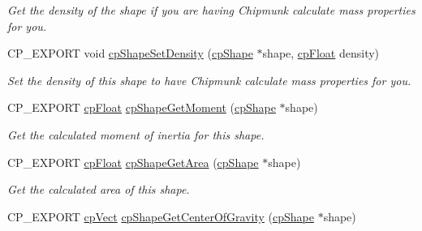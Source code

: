 \begin{DoxyCompactItemize}
\begin{DoxyCompactList}\small\item\em Get the density of the shape if you are having Chipmunk calculate mass properties for you. \end{DoxyCompactList}\item 
\mbox{\label{group__cp_shape_ga6b52b02dd8c60fb33713869ef5bba948}} 
C\+P\+\_\+\+E\+X\+P\+O\+RT void \mbox{\hyperlink{group__cp_shape_ga6b52b02dd8c60fb33713869ef5bba948}{cp\+Shape\+Set\+Density}} (\mbox{\hyperlink{structcp_shape}{cp\+Shape}} $\ast$shape, \mbox{\hyperlink{group__basic_types_gac1ed65573e035bf892505768c852d8d3}{cp\+Float}} density)
\begin{DoxyCompactList}\small\item\em Set the density of this shape to have Chipmunk calculate mass properties for you. \end{DoxyCompactList}\item 
\mbox{\label{group__cp_shape_ga5b6d2a25a83812d8d97b40ad7d956c8e}} 
C\+P\+\_\+\+E\+X\+P\+O\+RT \mbox{\hyperlink{group__basic_types_gac1ed65573e035bf892505768c852d8d3}{cp\+Float}} \mbox{\hyperlink{group__cp_shape_ga5b6d2a25a83812d8d97b40ad7d956c8e}{cp\+Shape\+Get\+Moment}} (\mbox{\hyperlink{structcp_shape}{cp\+Shape}} $\ast$shape)
\begin{DoxyCompactList}\small\item\em Get the calculated moment of inertia for this shape. \end{DoxyCompactList}\item 
\mbox{\label{group__cp_shape_gac9d45f5ebc8e18552d75889c3899a9cf}} 
C\+P\+\_\+\+E\+X\+P\+O\+RT \mbox{\hyperlink{group__basic_types_gac1ed65573e035bf892505768c852d8d3}{cp\+Float}} \mbox{\hyperlink{group__cp_shape_gac9d45f5ebc8e18552d75889c3899a9cf}{cp\+Shape\+Get\+Area}} (\mbox{\hyperlink{structcp_shape}{cp\+Shape}} $\ast$shape)
\begin{DoxyCompactList}\small\item\em Get the calculated area of this shape. \end{DoxyCompactList}\item 
\mbox{\label{group__cp_shape_ga1d9c68cf011696d081c61897ca6bb07b}} 
C\+P\+\_\+\+E\+X\+P\+O\+RT \mbox{\hyperlink{structcp_vect}{cp\+Vect}} \mbox{\hyperlink{group__cp_shape_ga1d9c68cf011696d081c61897ca6bb07b}{cp\+Shape\+Get\+Center\+Of\+Gravity}} (\mbox{\hyperlink{structcp_shape}{cp\+Shape}} $\ast$shape)

\end{DoxyCompactItemize}
